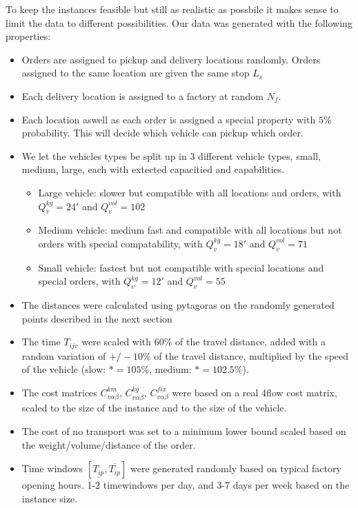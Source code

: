 \documentclass[../main.tex]{subfiles}
\begin{document}
\par
To keep the instances feasible but still as realistic as possbile it makes sense to limit the data to different possibilities.
Our data was generated with the following properties:
\begin{itemize}
    \item Orders are assigned to pickup and delivery locations randomly. Orders assigned to the same location are given the same stop $L_s$
    \item Each delivery location is assigned to a factory at random $N_f$.
    \item Each location aswell as each order is assigned a special property with $5\%$ probability. This will decide which vehicle can pickup which order.
    \item We let the vehicles types be split up in 3 different vehicle types, small, medium, large, each with extected capacitied and capabilities.
        \begin{itemize}
            \item Large vehicle: slower but compatible with all locations and orders, with $Q^{kg}_v=24'$ and $Q^{vol}_v=102$
            \item Medium vehicle: medium fast and compatible with all locations but not orders with special compatability, with $Q^{kg}_v=18'$ and $Q^{vol}_v=71$ 
            \item Small vehicle: fastest but not compatible with special locations and special orders, with $Q^{kg}_v=12'$ and $Q^{vol}_v=55$ 
        \end{itemize}
    \item The distances were calculated using pytagoras on the randomly generated points described in the next section 
    \item The time $T_{ijv}$ were scaled with $60\%$ of the travel distance, added with a random variation of $+/- 10\%$ of the travel distance, multiplied by the speed of the vehicle (slow: $*=105\%$, medium: $*=102.5\%$).
    \item The cost matrices $C^{km}_{v\alpha\beta}$, $C^{kg}_{v\alpha\beta}$, $C^{fix}_{v\alpha\beta}$ were based on a real 4flow cost matrix, scaled to the size of the instance and to the size of the vehicle.  
    \item The cost of no transport was set to a minimum lower bound scaled based on the weight/volume/distance of the order.
    \item Time windows $[\underline{T_{ip}},\overline{T_{ip}}]$  were generated randomly based on typical factory opening hours. 1-2 timewindows per day, and 3-7 days per week based on the instance size. 
\end{itemize}
\end{document}
